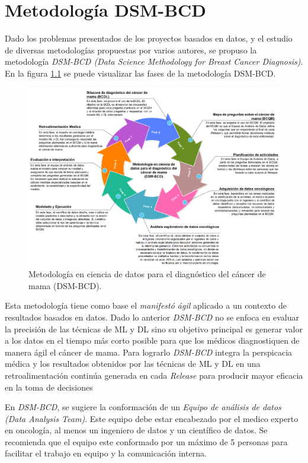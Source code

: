 \chapter{Metodología DSM-BCD}

Dado los problemas presentados de los proyectos basados en datos, y el estudio de diversas metodologías propuestas por varios autores, se propuso la metodología \textit{DSM-BCD (Data Science Methodology for Breast Cancer Diagnosis)}. En la figura \ref{DSM-BCD} se puede visualizar las fases de la metodología DSM-BCD.

\begin{figure}[!htb]
	\centering
	\includegraphics[width=0.9
	\linewidth]{IMAGENES/DSM-BCD_SPANISH.pdf}
	\caption{Metodología en ciencia de datos para el diagnóstico del cáncer de mama 
		(DSM-BCD)\cite{DSMBCD023}.}
	\label{DSM-BCD}
\end{figure}

Esta metodología tiene como base el \textit{manifestó ágil} aplicado a un contexto de resultados basados en datos. Dado lo anterior \textit{DSM-BCD} no se enfoca en evaluar la precisión de las técnicas de ML y DL sino su objetivo principal es generar valor a los datos en el tiempo más corto posible para que los médicos diagnostiquen de manera ágil el cáncer de mama. Para lograrlo \textit{DSM-BCD} integra la perspicacia médica y los resultados obtenidos por las técnicas de ML y DL en una retroalimentación continúa generada en cada \textit{Release} para producir mayor eficacia en la toma de decisiones

En \textit{DSM-BCD}, se sugiere la conformación de un \textit{Equipo de análisis de datos (Data Analysis Team)}. Este equipo debe estar encabezado por el medico experto en oncología, al menos un ingeniero de datos y un científico de datos. Se recomienda que el equipo este conformado por un máximo de 5 personas para facilitar el trabajo en equipo y la comunicación interna.

